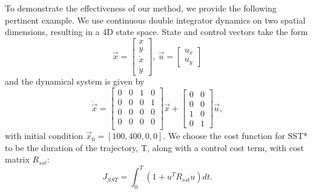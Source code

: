 To demonstrate the effectiveness of our method, we provide the following pertinent example. We use continuous double integrator dynamics on two spatial dimensions, resulting in a 4D state space. State and control vectors take the form
\begin{equation}
    \vec{x} =  \begin{bmatrix}
                    x \\
                    y \\
                    \dot x \\
                    \dot y
                \end{bmatrix},
    \ \vec{u} =  \begin{bmatrix}
                    u_x \\
                    u_y
                \end{bmatrix}
\end{equation}
and the dynamical system is given by
\begin{equation}
    \dot{\vec{x}} = %
                        \begin{bmatrix}
                            0 & 0 & 1 & 0 \\
                            0 & 0 & 0 & 1 \\
                            0 & 0 & 0 & 0 \\
                            0 & 0 & 0 & 0 \\
                        \end{bmatrix} \vec{x} +
                        \begin{bmatrix}
                            0 & 0 \\
                            0 & 0 \\
                            1 & 0 \\
                            0 & 1  
                        \end{bmatrix} \vec{u},
\end{equation}
with initial condition $\vec{x}_0 = [100, 400, 0, 0]$.
We choose the cost function for SST* to be the duration of the trajectory, T, along with a control cost term, with cost matrix $R_{sst}$:
\begin{equation}
    J_{SST} = \int_0^T \left( 1 + u^T R_{sst} u \right ) dt.
\end{equation}
